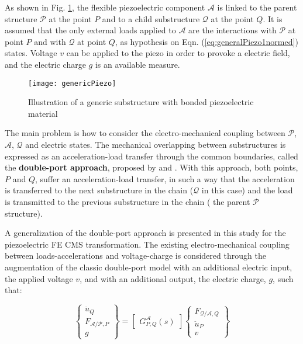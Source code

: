 \documentclass{ifacconf}
\begin{document}
As shown in Fig. \ref{fig:genericPiezo}, the flexible piezoelectric component $\mathcal{A}$ is linked to the parent structure $\mathcal{P}$ at the point $P$ and to a child substructure $\mathcal{Q}$ at the point $Q$. It is assumed that the only external loads applied to $\mathcal{A}$ are the interactions  with $\mathcal{P}$  at point $P$ and with $\mathcal{Q}$ at point $Q$, as hypothesis on Eqn. (\ref{eq:generalPiezo1normed}) states. Voltage $v$ can be applied to the piezo in order to provoke a electric field, and the electric charge $g$ is an available measure.

\begin{figure} 
\centering
\texttt{[image: genericPiezo]}
\caption{Illustration of a generic substructure with bonded piezoelectric material}
\label{fig:genericPiezo}
\end{figure}

The main problem is how to consider the electro-mechanical coupling between  $\mathcal{P}$, $\mathcal{A}$, $\mathcal{Q}$ and electric states.  The mechanical overlapping between substructures is expressed as an acceleration-load transfer through the common boundaries, called the \textbf{double-port approach}, proposed by \cite{Alazard2015_LM} and \cite{perez_IFAtheory2015}. With this approach, both points, $P$ and $Q$, suffer an acceleration-load transfer, in such a way that the acceleration is transferred to the next substructure in the chain ($\mathcal{Q}$ in this case) and the load is transmitted to the previous substructure  in the chain ( the parent $\mathcal{P}$ structure). 

A generalization of the double-port approach is presented in this study for the piezoelectric FE CMS transformation. The existing electro-mechanical coupling between loads-accelerations and voltage-charge is considered through the augmentation of the classic double-port model with an additional electric input, the applied voltage $v$, and with an additional output, the electric charge, $g$, such that:

\begin{equation}\label{eq:MAPC}
\begin{Bmatrix}\ddot{u}_Q \\ F_{\mathcal{A/P},P} \\ g \end{Bmatrix}= \begin{bmatrix}G^{\mathcal{A}}_{P,Q}(s) \end{bmatrix} \begin{Bmatrix} F_{\mathcal{Q/A},Q} \\\ddot{u}_P \\ v \end{Bmatrix}
\end{equation}
\end{document}
